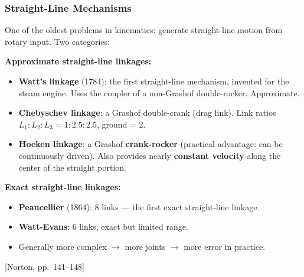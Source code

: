\documentclass[10pt,aspectratio=43]{beamer}
\newcommand{\pref}[1]{\vfill\hfill{\scriptsize\color{gray}[Norton, pp.~#1]}}
\begin{document}
\begin{frame}
\frametitle{Straight-Line Mechanisms}

One of the oldest problems in kinematics: generate straight-line motion from rotary input. Two categories:

\vspace{4pt}
\textbf{Approximate straight-line linkages:}
\begin{itemize}
  \item \textbf{Watt's linkage} (1784): the first straight-line mechanism, invented for the steam engine. Uses the coupler of a non-Grashof double-rocker. Approximate.
  \item \textbf{Chebyschev linkage}: a Grashof double-crank (drag link). Link ratios $L_1:L_2:L_3 = 1:2.5:2.5$, ground = $2$.
  \item \textbf{Hoeken linkage}: a Grashof \textbf{crank-rocker} (practical advantage: can be continuously driven). Also provides nearly \textbf{constant velocity} along the center of the straight portion.
\end{itemize}

\vspace{4pt}
\textbf{Exact straight-line linkages:}
\begin{itemize}
  \item \textbf{Peaucellier} (1864): 8 links --- the first exact straight-line linkage.
  \item \textbf{Watt-Evans}: 6 links, exact but limited range.
  \item Generally more complex $\to$ more joints $\to$ more error in practice.
\end{itemize}
\pref{141--148}
\end{frame}
\end{document}

